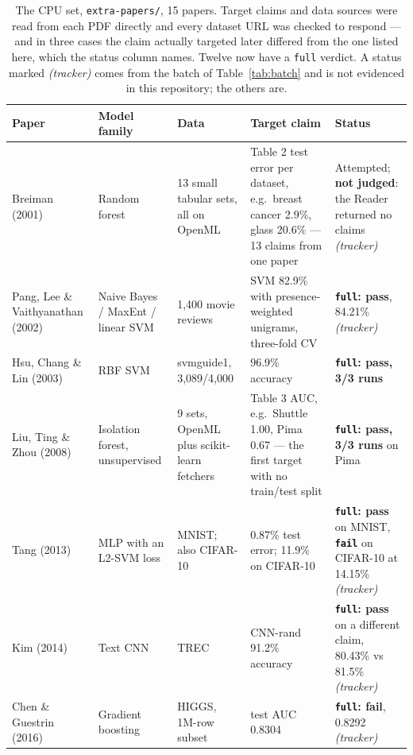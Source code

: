 \documentclass[10pt,twocolumn]{article}
\newcommand{\squeeze}{\setlength{\tabcolsep}{4pt}}
\begin{document}
\begin{table}[tbp]
\centering
\small
\caption{The CPU set, \texttt{extra-papers/}, 15 papers. Target claims and data sources were read
from each PDF directly and every dataset URL was checked to respond --- and in three cases the
claim actually targeted later differed from the one listed here, which the status column names.
Twelve now have a \texttt{full} verdict. A status marked \emph{(tracker)} comes from the batch of
Table~\ref{tab:batch} and is not evidenced in this repository; the others are.}
\label{tab:cpuset}
\squeeze
\begin{tabular}{L{0.165\textwidth}L{0.155\textwidth}L{0.145\textwidth}L{0.225\textwidth}L{0.165\textwidth}}
\toprule
Paper & Model family & Data & Target claim & Status \\
\midrule
Breiman (2001) \cite{breiman2001rf} & Random forest & 13 small tabular sets, all on OpenML &
  Table 2 test error per dataset, e.g.\ breast cancer 2.9\%, glass 20.6\% --- 13 claims from one
  paper & Attempted; \textbf{not judged}: the Reader returned no claims \emph{(tracker)} \\
Pang, Lee \& Vaithyanathan (2002) \cite{pang2002thumbs} & Naive Bayes / MaxEnt / linear SVM &
  1{,}400 movie reviews & SVM 82.9\% with presence-weighted unigrams, three-fold CV &
  \textbf{\texttt{full}: pass}, 84.21\% \emph{(tracker)} \\
Hsu, Chang \& Lin (2003) \cite{hsu2003guide} & RBF SVM & svmguide1, 3{,}089/4{,}000 & 96.9\%
  accuracy & \textbf{\texttt{full}: pass, 3/3 runs} \\
Liu, Ting \& Zhou (2008) \cite{liu2008iforest} & Isolation forest, unsupervised & 9 sets, OpenML
  plus scikit-learn fetchers & Table 3 AUC, e.g.\ Shuttle 1.00, Pima 0.67 --- the first target with
  no train/test split & \textbf{\texttt{full}: pass, 3/3 runs} on Pima \\
Tang (2013) \cite{tang2013dlsvm} & MLP with an L2-SVM loss & MNIST; also CIFAR-10 & 0.87\% test
  error; 11.9\% on CIFAR-10 & \textbf{\texttt{full}: pass} on MNIST, \textbf{\texttt{fail}} on
  CIFAR-10 at 14.15\% \emph{(tracker)} \\
Kim (2014) \cite{kim2014cnn} & Text CNN & TREC & CNN-rand 91.2\% accuracy &
  \textbf{\texttt{full}: pass} on a different claim, 80.43\% vs 81.5\% \emph{(tracker)} \\
Chen \& Guestrin (2016) \cite{chen2016xgboost} & Gradient boosting & HIGGS, 1M-row subset & test
  AUC 0.8304 & \textbf{\texttt{full}: fail}, 0.8292 \emph{(tracker)} \\

\end{tabular}
\end{table}
\end{document}
